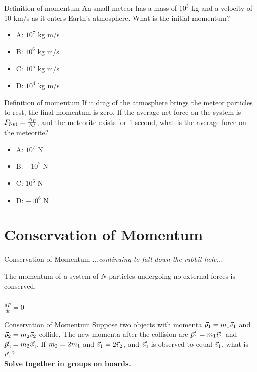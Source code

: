 \documentclass{beamer}
\begin{document}
\begin{frame}{Definition of momentum}
An small meteor has a mass of $10^{3}$ kg and a velocity of 10 km/s as it enters Earth's atmosphere.  What is the initial momentum?
\begin{itemize}
\item A: $10^{7}$ kg m/s
\item B: $10^{6}$ kg m/s
\item C: $10^{5}$ kg m/s
\item D: $10^{4}$ kg m/s
\end{itemize}
\end{frame}

\begin{frame}{Definition of momentum}
If it drag of the atmosphere brings the meteor particles to rest, the final momentum is zero.  If the average net force on the system is $F_{\rm Net} = \frac{\Delta p}{\Delta t}$, and the meteorite exists for 1 second, what is the average force on the meteorite?
\begin{itemize}
\item A: $10^{7}$ N
\item B: $-10^{7}$ N
\item C: $10^{6}$ N
\item D: $-10^{6}$ N
\end{itemize}
\end{frame}

\section{Conservation of Momentum}

\begin{frame}{Conservation of Momentum}
\textit{...continuing to fall down the rabbit hole...} \\ \vspace{1cm}
\begin{tcolorbox}[colback=white,colframe=red!40!blue,title=Conservation of Momentum]
\alert{The momentum of a system of $N$ particles undergoing no external forces is conserved.} \\ \\
\alert{$\frac{d\vec{P}}{dt}=0$}
\end{tcolorbox}
\end{frame}

\begin{frame}{Conservation of Momentum}
Suppose two objects with momenta $\vec{p}_{\rm 1} = m_{\rm 1}\vec{v}_{\rm 1}$ and $\vec{p}_{\rm 2} = m_{\rm 2}\vec{v}_{\rm 2}$ collide. The new momenta after the collision are $\vec{p}'_{\rm 1} = m_{\rm 1}\vec{v}'_{\rm 1}$ and $\vec{p}'_{\rm 2} = m_{\rm 2}\vec{v}'_{\rm 2}$.  If $m_{\rm 2} = 2 m_{\rm 1}$ and $\vec{v}_{\rm 1} = 2\vec{v}_{\rm 2}$, and $\vec{v}'_{\rm 2}$ is observed to equal $\vec{v}_{\rm 1}$, what is $\vec{v}'_{\rm 1}$? \\ \vspace{1cm}
\textbf{Solve together in groups on boards.}
\end{frame}
\end{document}
